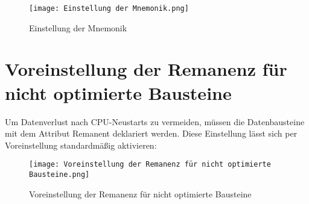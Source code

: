 \begin{figure}[!ht]
    \centering
    \texttt{[image: Einstellung der Mnemonik.png]}
    \caption{Einstellung der Mnemonik}
    \label{fig:Einstellung der Mnemonik}
\end{figure}

\clearpage
\section{Voreinstellung der Remanenz für nicht optimierte Bausteine}\label{subsec:Voreinstellung der Remanenz für nicht optimierte Bausteine}

Um Datenverlust nach CPU-Neustarts zu vermeiden, müssen die Datenbausteine mit dem Attribut \glqq Remanent \grqq{} deklariert werden. Diese Einstellung lässt sich per Voreinstellung standardmäßig aktivieren:

\begin{figure}[!ht]
    \centering
    \texttt{[image: Voreinstellung der Remanenz für nicht optimierte Bausteine.png]}
    \caption{Voreinstellung der Remanenz für nicht optimierte Bausteine}
    \label{fig:Voreinstellung der Remanenz für nicht optimierte Bausteine}
\end{figure}

